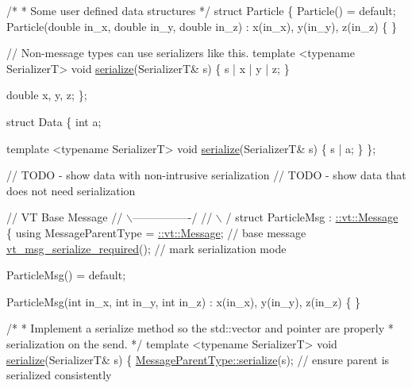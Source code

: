 \begin{DoxyCodeInclude}
\textcolor{comment}{/*}
\textcolor{comment}{ * Some user defined data structures}
\textcolor{comment}{ */}
\textcolor{keyword}{struct }Particle \{
  Particle() = \textcolor{keywordflow}{default};
  Particle(\textcolor{keywordtype}{double} in\_x, \textcolor{keywordtype}{double} in\_y, \textcolor{keywordtype}{double} in\_z)
    : x(in\_x), y(in\_y), z(in\_z)
  \{ \}

  \textcolor{comment}{// Non-message types can use serializers like this.}
  \textcolor{keyword}{template} <\textcolor{keyword}{typename} SerializerT>
  \textcolor{keywordtype}{void} \hyperlink{namespacecheckpoint_a075da4e7344cf037943362517e606c3a}{serialize}(SerializerT& s) \{
    s | x | y | z;
  \}

  \textcolor{keywordtype}{double} x, y, z;
\};

\textcolor{keyword}{struct }Data \{
  \textcolor{keywordtype}{int} a;

  \textcolor{keyword}{template} <\textcolor{keyword}{typename} SerializerT>
  \textcolor{keywordtype}{void} \hyperlink{namespacecheckpoint_a075da4e7344cf037943362517e606c3a}{serialize}(SerializerT& s) \{
    s | a;
  \}
\};

\textcolor{comment}{// TODO - show data with non-intrusive serialization}
\textcolor{comment}{// TODO - show data that does not need serialization}

\textcolor{comment}{//                  VT Base Message}
\textcolor{comment}{//                 \(\backslash\)----------------/}
\textcolor{comment}{//                  \(\backslash\)              /}
\textcolor{keyword}{struct }ParticleMsg : \hyperlink{structvt_1_1messaging_1_1_active_msg}{::vt::Message} \{
  \textcolor{keyword}{using} MessageParentType = \hyperlink{namespacevt_a3a3ddfef40b4c90915fa43cdd5f129ea}{::vt::Message}; \textcolor{comment}{// base message}
  \hyperlink{message__serialize_8h_a54128d5338aaa9c918179826085e13d1}{vt\_msg\_serialize\_required}();         \textcolor{comment}{// mark serialization mode}

  ParticleMsg() = \textcolor{keywordflow}{default};

  ParticleMsg(\textcolor{keywordtype}{int} in\_x, \textcolor{keywordtype}{int} in\_y, \textcolor{keywordtype}{int} in\_z)
    : x(in\_x), y(in\_y), z(in\_z)
  \{ \}

  \textcolor{comment}{/*}
\textcolor{comment}{   * Implement a serialize method so the std::vector and pointer are properly}
\textcolor{comment}{   * serialization on the send.}
\textcolor{comment}{   */}
  \textcolor{keyword}{template} <\textcolor{keyword}{typename} SerializerT>
  \textcolor{keywordtype}{void} \hyperlink{namespacecheckpoint_a075da4e7344cf037943362517e606c3a}{serialize}(SerializerT& s) \{
    \hyperlink{namespacecheckpoint_a075da4e7344cf037943362517e606c3a}{MessageParentType::serialize}(s);    \textcolor{comment}{// ensure parent is serialized
       consistently}


\end{DoxyCodeInclude}
